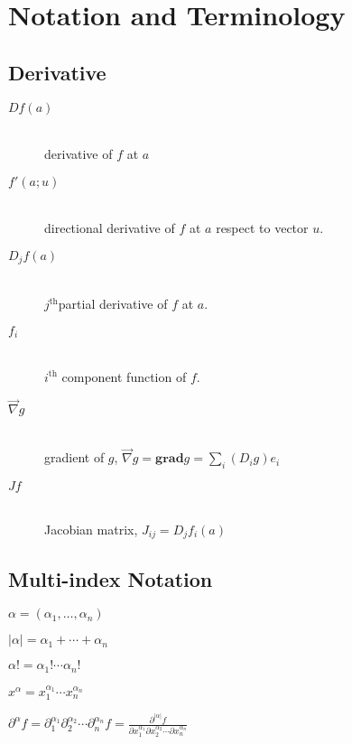 \section{Notation and Terminology}

\subsection{Derivative}

\begin{description}
	\item[$Df(a)$] \hfill \\
		derivative of $f$ at $a$
		
	\item[$f'(a;u)$] \hfill \\
		directional derivative of $f$ at $a$ respect to vector $u$.
		
	\item[$D_jf(a)$] \hfill \\
		$j^\textrm{th}$partial derivative of $f$ at $a$.

	\item[$f_i$] \hfill \\
		$i^\textrm{th}$ component function of $f$.

	\item[$\vec\nabla g$] \hfill \\
		gradient of $g$, $\vec\nabla g = \mathbf{grad} g = \sum_i (D_ig)e_i$

	\item[$J f$] \hfill \\
		Jacobian matrix, $J_{ij} = D_jf_i(a)$
\end{description}

\subsection{Multi-index Notation}
\label{multiindex}

	$\alpha = (\alpha_1, \ldots, \alpha_n)$
	
	$|\alpha| = \alpha_1 + \cdots + \alpha_n$
	
	$\alpha! = \alpha_1! \cdots \alpha_n!$
	
	$x^\alpha = x_1^{\alpha_1} \cdots x_n^{\alpha_n}$

	$\partial^\alpha f = \partial_1^{\alpha_1}\partial_2^{\alpha_2} \cdots \partial_n^{\alpha_n} f = \frac{\partial^{|\alpha|}f}{\partial x_1^{\alpha_1} \partial x_2^{\alpha_2} \cdots \partial x_n^{\alpha_n}}$
	